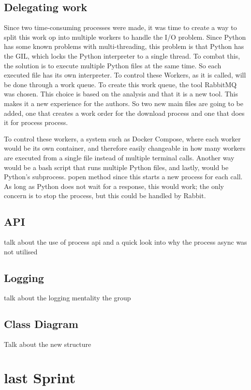 \subsection{Delegating work}
Since two time-consuming processes were made, it was time to create a way to split this work op into multiple workers to handle the I/O problem.
Since Python has some known problems with multi-threading, this problem is that Python has the \acrfull{GIL}, which locks the Python interpreter to a single thread. 
To combat this, the solution is to execute multiple Python files at the same time. So each executed file has its own interpreter.
To control these Workers, as it is called, will be done through a work queue. To create this work queue, the tool RabbitMQ was chosen.
This choice is based on the analysis and that it is a new tool. This makes it a new experience for the authors. 
So two new main files are going to be added, one that creates a work order for the download process and one that does it for process process.

To control these workers, a system such as Docker Compose, where each worker would be its own container, and therefore easily changeable in how many workers are executed from a single file instead of multiple terminal calls.
Another way would be a bash script that runs multiple Python files, and lastly, would be Python's subprocess. popen method since this starts a new process for each call. As long as Python does not wait for a response, this would work; the only concern is to stop the process, but this could be handled by Rabbit. 

\subsection{API}
talk about the use of process api and a quick look into why the process async was not utilised

\subsection{Logging}
talk about the logging mentality the group 

\subsection{Class Diagram}
Talk about the new structure

\section{last Sprint}\label{Sec:ThirdPhase}


